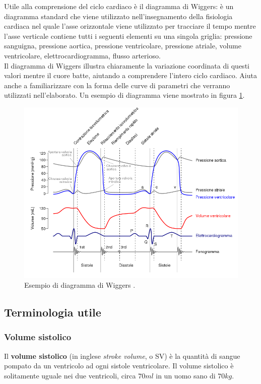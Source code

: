 Utile alla comprensione del ciclo cardiaco è il diagramma di Wiggers: è un diagramma standard che viene utilizzato nell'insegnamento della fisiologia cardiaca nel quale l'asse orizzontale viene utilizzato per tracciare il tempo mentre l'asse verticale contiene tutti i seguenti elementi su una singola griglia: pressione sanguigna, pressione aortica, pressione ventricolare, pressione atriale, volume ventricolare, elettrocardiogramma, flusso arterioso.\\
Il diagramma di Wiggers illustra chiaramente la variazione coordinata di questi valori mentre il cuore batte, aiutando a comprendere l'intero ciclo cardiaco. Aiuta anche a familiarizzare con la forma delle curve di parametri che verranno utilizzati nell'elaborato. Un esempio di diagramma viene mostrato in figura \ref{WiggersDiagramma}.


\begin{figure}[h]
    \centering
    \includegraphics[width=1\textwidth]{images/Windkessel/Wiggers_Diagram_IT.svg.png}
    \caption{Esempio di diagramma di Wiggers \cite{wiki:DiagrammaWiggers}.}
    \label{WiggersDiagramma}
\end{figure}



\newpage

\subsection{Terminologia utile}\label{terminologia}

\subsubsection{Volume sistolico}
Il \textbf{volume sistolico} (in inglese \textit{stroke volume}, o SV) è la quantità di sangue pompato da un ventricolo ad ogni sistole ventricolare. Il volume sistolico è solitamente uguale nei due ventricoli, circa $70ml$ in un uomo sano di $70kg$.



